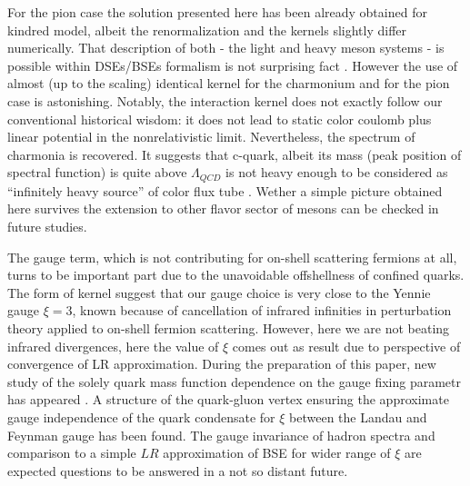\documentclass[aps,prd,superscriptaddress,eqsecnum,amsfonts,showpacs,epsfig]{revtex4}
\begin{document}
For the pion case the solution presented here has been already obtained for kindred model, albeit the renormalization and the kernels  slightly differ numerically. That description of both - the light and heavy meson systems - is possible within  DSEs/BSEs formalism is not surprising fact \cite{HPGK2015}. However the use of  almost (up to the scaling) identical kernel  for the charmonium and for the pion case is astonishing. 
Notably, the interaction kernel  does not exactly follow our conventional historical wisdom: it does not lead to static  color coulomb plus linear potential in the nonrelativistic limit.  Nevertheless, the spectrum of charmonia is recovered.  It suggests that c-quark, albeit its mass (peak position of spectral function) is quite above $\Lambda_{QCD}$ is not heavy enough to be considered as ``infinitely heavy  source'' of color flux tube \cite{BSS1995}. Wether a simple picture obtained here survives the   extension to other flavor sector of mesons can be checked in future studies.  

 The gauge term, which is not contributing  for on-shell scattering fermions at all, turns to be important part due to the unavoidable offshellness of confined quarks.  The form of kernel suggest that our  gauge choice is very close to the Yennie gauge $\xi=3$, known because of  cancellation of infrared infinities in perturbation theory applied to on-shell fermion scattering. However, here we are not beating infrared divergences,  here the value of $\xi$  comes out as result   due to  perspective of  convergence of LR approximation.  During the preparation of this paper, new study of the solely  quark mass function dependence on the gauge fixing parametr has appeared  \cite{LSBBO2023}.  A structure of the quark-gluon vertex ensuring the approximate gauge independence of the quark condensate for $\xi$ between the Landau and Feynman gauge has been found. The  gauge invariance  of hadron spectra  and comparison to a simple $LR$ approximation of BSE for wider range of $\xi$ are expected questions to be answered in a not so distant future.
 
\end{document}

